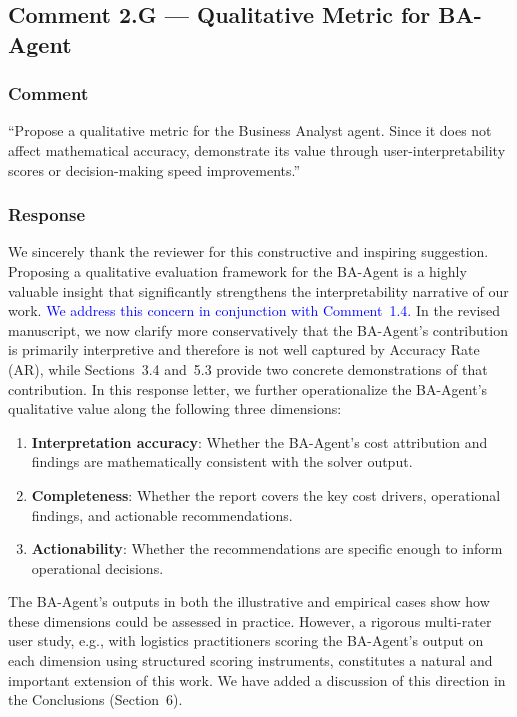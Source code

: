\documentclass[11pt,a4paper]{article}
\begin{document}
\subsection{Comment 2.G --- Qualitative Metric for BA-Agent}

\subsubsection{Comment}
``Propose a qualitative metric for the Business Analyst agent. Since it does not affect mathematical accuracy, demonstrate its value through user-interpretability scores or decision-making speed improvements.''

\subsubsection{Response}
We sincerely thank the reviewer for this constructive and inspiring suggestion. Proposing a qualitative evaluation framework for the BA-Agent is a highly valuable insight that significantly strengthens the interpretability narrative of our work. \textcolor{blue}{We address this concern in conjunction with Comment~1.4.} In the revised manuscript, we now clarify more conservatively that the BA-Agent's contribution is primarily interpretive and therefore is not well captured by Accuracy Rate (AR), while Sections~3.4 and~5.3 provide two concrete demonstrations of that contribution. In this response letter, we further operationalize the BA-Agent's qualitative value along the following three dimensions:
\begin{enumerate}
    \item \textbf{Interpretation accuracy}: Whether the BA-Agent's cost attribution and findings are mathematically consistent with the solver output.
    \item \textbf{Completeness}: Whether the report covers the key cost drivers, operational findings, and actionable recommendations.
    \item \textbf{Actionability}: Whether the recommendations are specific enough to inform operational decisions.
\end{enumerate}
The BA-Agent's outputs in both the illustrative and empirical cases show how these dimensions could be assessed in practice. However, a rigorous multi-rater user study, e.g., with logistics practitioners scoring the BA-Agent's output on each dimension using structured scoring instruments, constitutes a natural and important extension of this work. We have added a discussion of this direction in the Conclusions (Section~6).
\end{document}
